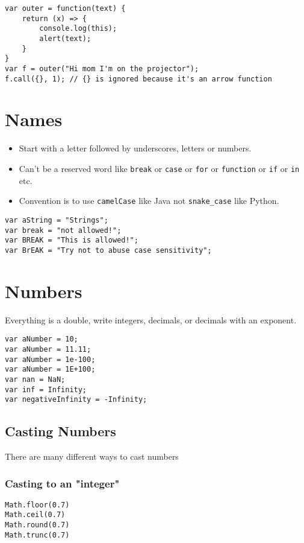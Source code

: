 \documentclass[../CMPUT-404-Notes.tex]{subfiles}
\begin{document}
\begin{verbatim}
var outer = function(text) {
    return (x) => {
        console.log(this);
        alert(text);
    }
}
var f = outer("Hi mom I'm on the projector");
f.call({}, 1); // {} is ignored because it's an arrow function
\end{verbatim}

\section{Names} 
\begin{itemize}
    \item Start with a letter followed by underscores, letters or numbers.
    \item Can't be a reserved word like \texttt{break} or \texttt{case} or \texttt{for} or \texttt{function} or \texttt{if} or \texttt{in} etc.
    \item Convention is to use \texttt{camelCase} like Java not \texttt{snake_case} like Python.
\end{itemize}
\begin{verbatim}
var aString = "Strings";
var break = "not allowed!";
var BREAK = "This is allowed!";
var BrEAK = "Try not to abuse case sensitivity";
\end{verbatim}

\section{Numbers}
Everything is a double, write integers, decimals, or decimals with an exponent.
\begin{verbatim}
var aNumber = 10;
var aNumber = 11.11;
var aNumber = 1e-100;
var aNumber = 1E+100;
var nan = NaN;
var inf = Infinity;
var negativeInfinity = -Infinity;
\end{verbatim}

\subsection{Casting Numbers}
There are many different ways to cast numbers 
\subsubsection{Casting to an "integer"}
\begin{verbatim}
Math.floor(0.7)
Math.ceil(0.7)
Math.round(0.7)
Math.trunc(0.7)
\end{verbatim}
\end{document}

